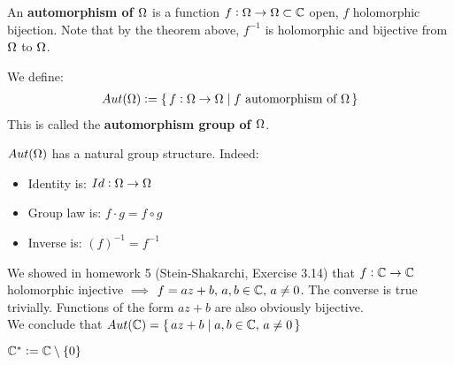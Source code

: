 \begin{definition}[Automorphism]
An \textbf{automorphism of $\Omega$} is a function $f: \Omega \to \Omega \subset \mathbb{C}$ open, $f$ holomorphic bijection. Note that by the theorem above, $f^{-1}$ is holomorphic and bijective from $\Omega $ to $\Omega$.
\end{definition}

\begin{definition}
We define:
\begin{align*}
Aut(\Omega) \vcentcolon = \set{f:\Omega\to \Omega\mid f \text{ automorphism of } \Omega}
\end{align*}
This is called the \textbf{automorphism group of $\Omega$}.
\end{definition}

\begin{note}
$Aut(\Omega)$ has a natural group structure. Indeed:

\begin{itemize}
    \item Identity is: $Id : \Omega \to \Omega$
    \item Group law is: $f \cdot g = f \circ g$
    \item Inverse is: $(f)^{-1} = f^{-1}$
\end{itemize}

\end{note}

\begin{example}[$Aut(\C)$]

We showed in homework 5 (Stein-Shakarchi, Exercise 3.14) that $f: \mathbb{C} \to \mathbb{C} $ holomorphic injective $\implies$ $f = az+b, \, a,b \in \mathbb{C}, \, a \neq 0$. The converse is true trivially. Functions of the form $az+b$ are also obviously bijective.\\

We conclude that $Aut(\mathbb{C}) = \set{az+b \mid a,b \in \mathbb{C}, \, a \neq 0}$


\end{example}

\begin{notation}
$\mathbb{C}^* \vcentcolon= \mathbb{C} \setminus \{ 0 \} $
\end{notation}


